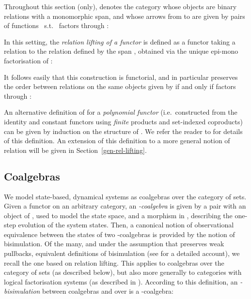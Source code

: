 \documentclass[submission,copyright,creativecommons]{eptcs}
\theoremstyle{plain}\newtheorem{theorem}{Theorem}[section]
\theoremstyle{remark}
\begin{document}
Throughout this section (only), {} denotes the category whose objects are binary relations  with  a monomorphic span, and whose arrows from  to  are given by pairs of functions  ~s.t.~  factors through :

In this setting, the \emph{relation lifting of a functor } is defined as a functor  taking a relation  to the relation defined by the span , obtained via the unique epi-mono factorisation of :

It follows easily that this construction is functorial, and in particular preserves the order  between relations on the same objects given by  if and only if  factors through :

An alternative definition of  for  a \emph{polynomial functor} (i.e.~constructed from the identity and constant functors using \emph{finite} products and set-indexed coproducts) can be given by induction on the structure of . We refer the reader to \cite[Section~3.1]{JacobsBook} for details of this definition. An extension of this definition to a more general notion of relation will be given in Section~\ref{gen-rel-lifting}.

\subsection{Coalgebras}
\label{section-coalgebras}
We model state-based, dynamical systems as coalgebras over the category of sets. Given a functor  on an arbitrary category, an \emph{-coalgebra} is given by a pair  with  an object of , used to model the state space, and  a morphism in , describing the one-step evolution of the system states. Then, a canonical notion of observational equivalence between the states of two -coalgebras is provided by the notion of bisimulation. Of the many, and under the assumption that  preserves weak pullbacks, equivalent definitions of bisimulation (see \cite{JacobsBook} for a detailed account), we recall the one based on relation lifting. This applies to coalgebras over the category of sets (as described below), but also more generally to categories with logical factorisation systems (as described in \cite{JacobsBook}). According to this definition, an \emph{-bisimulation} between coalgebras  and  over  is a -coalgebra:
\end{document}
